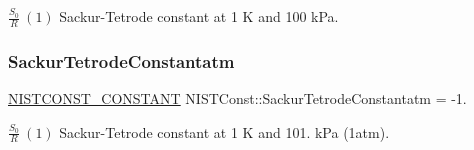$\frac{S_0}{R} \ (1)$ Sackur-\/\+Tetrode constant at 1 K and 100 k\+Pa. \mbox{\label{group___n_i_s_t_const-_sackur_tetrode_constant_ga7f3efde326ea5cfe5e2d85d81a92fb3b}} 
\subsubsection{\texorpdfstring{Sackur\+Tetrode\+Constantatm}{SackurTetrodeConstantatm}}
{\footnotesize\ttfamily \mbox{\hyperlink{group___n_i_s_t_const-_macros_ga2b0fc1d7452373f816175dd86ce26729}{N\+I\+S\+T\+C\+O\+N\+S\+T\+\_\+\+C\+O\+N\+S\+T\+A\+NT}} N\+I\+S\+T\+Const\+::\+Sackur\+Tetrode\+Constantatm = -\/1.}

$\frac{S_0}{R} \ (1)$ Sackur-\/\+Tetrode constant at 1 K and 101. k\+Pa (1atm). 